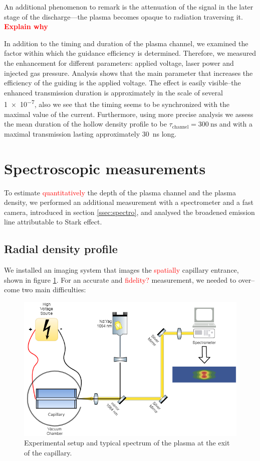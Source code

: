 \documentclass[../main.tex]{subfiles}
\begin{document}
An additional phenomenon to remark is the attenuation of the signal in the later stage of the discharge---the plasma becomes opaque to radiation traversing it. \textcolor{red}{\textbf{Explain why}}

In addition to the timing and duration of the plasma channel, we examined the factor within which the guidance efficiency is determined. Therefore, we measured the enhancement for different parameters: applied voltage, laser power and injected gas pressure. Analysis shows that the main parameter that increases the efficiency of the guiding is the applied voltage. The effect is easily visible--the enhanced transmission duration is approximately in the scale of several \SI{1e-7}{\sec}, also we see that the timing seems to be synchronized with the maximal value of the current. Furthermore, using more precise analysis we assess the mean duration of the hollow density profile to be $\tau_\text{channel}=\SI{300}{\ns}$ and with a maximal transmission lasting approximately \SI{30}{\ns} long.

\section{Spectroscopic measurements}\label{sec:spectro}
To estimate \textcolor{red}{quantitatively} the depth of the plasma channel and the plasma density, we performed an additional measurement with a spectrometer and a fast camera, introduced in section \ref{ssec:spectro}, and analysed the broadened emission line attributable to Stark effect.

\subsection{Radial density profile}\label{ssec:radial}
We installed an imaging system that images the \textcolor{red}{spatially} capillary entrance, shown in figure \ref{fig:radial_system}. For an accurate and \textcolor{red}{fidelity?} measurement, we needed to over--come two main difficulties:

\begin{figure}
\centering
\includegraphics[width=\textwidth]{./figures/spectro/radial_system.png}
\caption{Experimental setup and typical spectrum of the plasma at the exit of the capillary.}
\label{fig:radial_system}
\end{figure}
\end{document}

